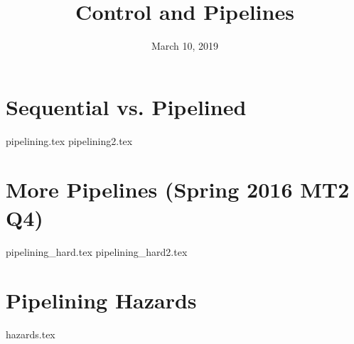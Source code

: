 \documentclass[11pt]{exam}
\title{Control and Pipelines}
\date{March 10, 2019}
\begin{document}
\maketitle

\section{Sequential vs. Pipelined}
\begin{questions}
{pipelining.tex}
{pipelining2.tex}
\end{questions}
\newpage

\section{More Pipelines (Spring 2016 MT2 Q4)}
\begin{questions}
{pipelining_hard.tex}
{pipelining_hard2.tex}
\end{questions}
\newpage

\section{Pipelining Hazards}
\begin{questions}
{hazards.tex}
\end{questions}
\end{document}
